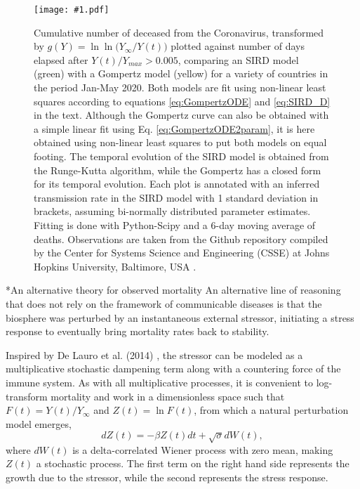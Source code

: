 \documentclass[sn-mathphys]{sn-jnl}%
\newcommand{\insertPdfFig}[3]{
  \begin{figure}[h]
  \centering
  \texttt{[image: \#1.pdf]}
  \caption{#2}
  \label{fig:#1}
  \end{figure}
}
\theoremstyle{thmstyleone}%
\theoremstyle{thmstyletwo}%
\theoremstyle{thmstylethree}%
\begin{document}
\insertPdfFig{Gompertz_vs_SIRD_lnln_infty}{Cumulative number of deceased from the Coronavirus, transformed by $g(Y)=\ln{\ln{({Y_{\infty} / Y(t))}}}$ plotted against number of days elapsed after $Y(t) / Y_{max}>0.005$, comparing an SIRD model (green) with a Gompertz model (yellow) for a variety of countries in the period Jan-May 2020. Both models are fit using non-linear least squares according to equations \ref{eq:GompertzODE} and \ref{eq:SIRD_D} in the text. Although the Gompertz curve can also be obtained with a simple linear fit using Eq. \ref{eq:GompertzODE2param}, it is here obtained using non-linear least squares to put both models on equal footing. The temporal evolution of the SIRD model is obtained from the Runge-Kutta algorithm, while the Gompertz has a closed form for its temporal evolution. Each plot is annotated with an inferred transmission rate in the SIRD model with 1 standard deviation in brackets, assuming bi-normally distributed parameter estimates. Fitting is done with Python-Scipy and a 6-day moving average of deaths. Observations are taken from the Github repository compiled by the Center for Systems Science and Engineering (CSSE) at Johns Hopkins University, Baltimore, USA \cite{dong2020interactive}.} 


\section*{An alternative theory for observed mortality}
\label{seq:alt}
An alternative line of reasoning that does not rely on the framework of communicable diseases is that the biosphere was perturbed by an instantaneous external stressor, initiating a stress response to eventually bring mortality rates back to stability.

Inspired by De Lauro et al. (2014) \cite{de2014stochastic}, the stressor can be modeled as a multiplicative stochastic dampening term along with a countering force of the immune system. 
As with all multiplicative processes, it is convenient to log-transform mortality and work in a dimensionless space such that $F(t)=Y(t)/Y_\infty$ and $Z(t)=\ln{F}(t)$, from which a natural perturbation model emerges,
\begin{equation}
\label{eq:microscopic}
dZ(t)= -\beta Z(t) dt + \sqrt{\sigma}dW(t),
\end{equation}
where $dW(t)$ is a delta-correlated Wiener process with zero mean, making $Z(t)$ a stochastic process. The first term on the right hand side represents the growth due to the stressor, while the second represents the stress response.  
\end{document}
